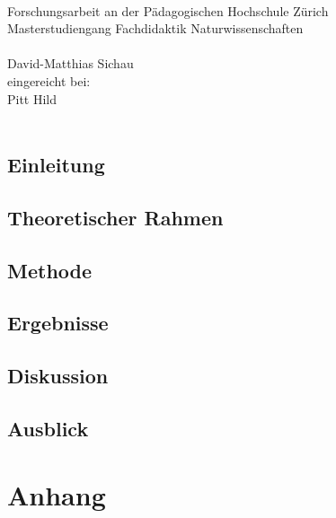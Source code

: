 \documentclass[12pt,oneside, DIV11]{scrartcl}
\begin{document}
\begin{titlepage}
	\vspace*{2cm}
	\begin{center}
		{\LARGE \label{Entwicklung eines hands-on Experimentiertests zur Kompetenz des skalenbasierenden Messens}
		 \vspace*{2cm}\\ Forschungsarbeit an der Pädagogischen Hochschule Zürich\vspace*{1cm}\\Masterstudiengang Fachdidaktik Naturwissenschaften\\}
		\vspace*{2cm}{\normalsize vorgelegt von:}\\ \large David-Matthias Sichau \\
		\vspace*{1.5cm} {\normalsize  eingereicht bei:}\\ \large Pitt Hild \\
		\vspace*{2cm}{\large 05. Februar 2015, Zürich}\\
	\end{center}
\end{titlepage}




\tableofcontents









\section{Einleitung}

\section{Theoretischer Rahmen}

\section{Methode}

\section{Ergebnisse}

\section{Diskussion}

\section{Ausblick}



\appendix 





\printbibliography[heading=bibintoc]

\chapter{Anhang}

\end{document}
